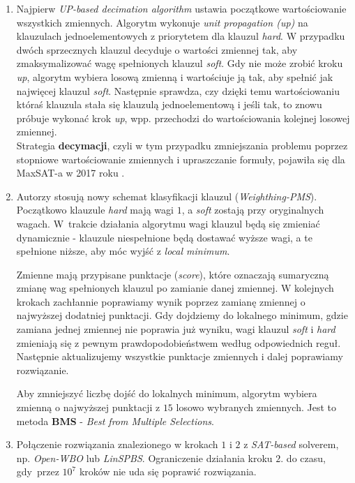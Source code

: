 \documentclass[shortabstract]{iithesis}
\begin{document}
\begin{enumerate}
	\item Najpierw \textit{UP-based decimation algorithm} ustawia początkowe wartościowanie wszystkich zmiennych. Algorytm wykonuje \textit{unit propagation (up)} na klauzulach jednoelementowych z priorytetem dla klauzul \textit{hard}. W przypadku dwóch sprzecznych klauzul decyduje o wartości zmiennej tak, aby zmaksymalizować wagę spełnionych klauzul \textit{soft}. Gdy nie może zrobić kroku \textit{up}, algorytm wybiera losową zmienną i wartościuje ją tak, aby spełnić jak najwięcej klauzul \textit{soft}. Następnie sprawdza, czy dzięki temu wartościowaniu któraś klauzula stała się klauzulą jednoelementową i jeśli tak, to znowu próbuje wykonać krok \textit{up}, wpp. przechodzi do wartościowania kolejnej losowej zmiennej. \\
	Strategia \textbf{decymacji}, czyli w tym przypadku zmniejszania problemu poprzez stopniowe wartościowanie zmiennych i upraszczanie formuły, pojawiła się dla MaxSAT-a w 2017 roku \cite{decimation}. 
	
	\item Autorzy stosują nowy schemat klasyfikacji klauzul (\textit{Weighthing-PMS}). Początkowo klauzule \textit{hard} mają wagi $1$, a \textit{soft} zostają przy oryginalnych wagach. W~trakcie działania algorytmu wagi klauzul będą się zmieniać dynamicznie - klauzule niespełnione będą dostawać wyższe wagi, a te spełnione niższe, aby móc wyjść z \textit{local minimum}. 
	
	Zmienne mają przypisane punktacje (\textit{score}), które oznaczają sumaryczną zmianę wag spełnionych klauzul po zamianie danej zmiennej. 
	W kolejnych krokach zachłannie poprawiamy wynik poprzez zamianę zmiennej o najwyższej dodatniej punktacji. Gdy dojdziemy do lokalnego minimum, gdzie zamiana jednej zmiennej nie poprawia już wyniku, wagi klauzul \textit{soft} i \textit{hard} zmieniają się z pewnym prawdopodobieństwem według odpowiednich reguł. Następnie  aktualizujemy wszystkie punktacje zmiennych i dalej poprawiamy rozwiązanie.
	
	Aby zmniejszyć liczbę dojść do lokalnych minimum, algorytm wybiera zmienną o najwyższej punktacji z $15$ losowo wybranych zmiennych. Jest to metoda \textbf{BMS} - \textit{Best from Multiple Selections}. 
	\item Połączenie rozwiązania znalezionego w krokach $1$ i $2$ z \textit{SAT-based} solverem, np. \textit{Open-WBO} lub \textit{LinSPBS}. Ograniczenie działania kroku $2.$ do czasu, gdy~przez $10^7$ kroków nie uda się poprawić rozwiązania.
\end{enumerate}
\end{document}

